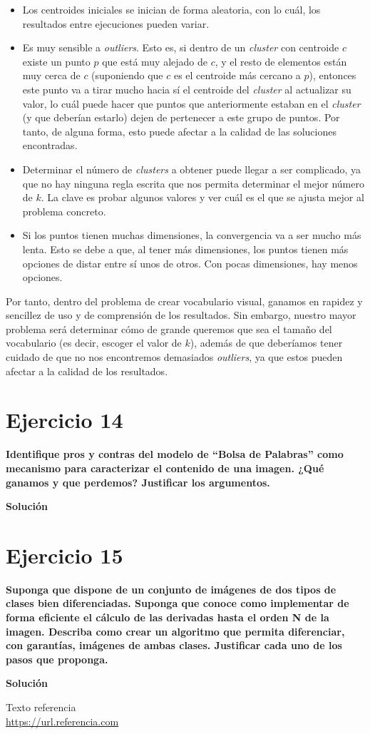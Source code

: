 \documentclass[11pt,a4paper]{article}
\newcommand{\answer}{\noindent\textbf{Solución}}
\newcommand{\question}[1]{\noindent\textbf{#1}}
\newcommand{\nonumbersection}[1]{\section*{#1}\addcontentsline{toc}{section}{#1}}
\begin{document}
\begin{itemize}
	\item Los centroides iniciales se inician de forma aleatoria, con lo cuál, los resultados entre ejecuciones pueden variar.
	\item Es muy sensible a \textit{outliers}. Esto es, si dentro de un \textit{cluster} con centroide $c$ existe un punto $p$
	que está muy alejado de $c$, y el resto de elementos están muy cerca de $c$ (suponiendo que $c$ es el centroide más cercano
	a $p$), entonces este punto va a tirar mucho hacia sí el centroide del \textit{cluster} al actualizar su valor, lo cuál
	puede hacer que puntos que anteriormente estaban en el \textit{cluster} (y que deberían estarlo) dejen de pertenecer a
	este grupo de puntos. Por tanto, de alguna forma, esto puede afectar a la calidad de las soluciones encontradas.
	\item Determinar el número de \textit{clusters} a obtener puede llegar a ser complicado, ya que no hay ninguna regla escrita
	que nos permita determinar el mejor número de $k$. La clave es probar algunos valores y ver cuál es el que se ajusta
	mejor al problema concreto.
	\item Si los puntos tienen muchas dimensiones, la convergencia va a ser mucho más lenta. Esto se debe a que, al tener más
	dimensiones, los puntos tienen más opciones de distar entre sí unos de otros. Con pocas dimensiones, hay menos opciones.
\end{itemize}

Por tanto, dentro del problema de crear vocabulario visual, ganamos en rapidez y sencillez de uso y de comprensión de los
resultados. Sin embargo, nuestro mayor problema será determinar cómo de grande queremos que sea el tamaño del vocabulario (es
decir, escoger el valor de $k$), además de que deberíamos tener cuidado de que no nos encontremos demasiados \textit{outliers},
ya que estos pueden afectar a la calidad de los resultados.

\nonumbersection{Ejercicio 14}

\question{Identifique pros y contras del modelo de “Bolsa de Palabras” como
mecanismo para caracterizar el contenido de una imagen. ¿Qué ganamos y
que perdemos? Justificar los argumentos.}

\answer

\nonumbersection{Ejercicio 15}

\question{Suponga que dispone de un conjunto de imágenes de dos tipos de
clases bien diferenciadas. Suponga que conoce como implementar de forma
eficiente el cálculo de las derivadas hasta el orden N de la imagen.
Describa como crear un algoritmo que permita diferenciar, con garantías,
imágenes de ambas clases. Justificar cada uno de los pasos que proponga.}

\answer

\newpage

\begin{thebibliography}{5}

Texto referencia
\\\url{https://url.referencia.com}

\end{thebibliography}
\end{document}
